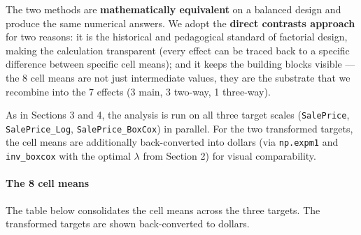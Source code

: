 The two methods are \textbf{mathematically equivalent} on a balanced
design and produce the same numerical answers. We adopt the
\textbf{direct contrasts approach} for two reasons: it is the historical
and pedagogical standard of factorial design, making the calculation
transparent (every effect can be traced back to a specific difference
between specific cell means); and it keeps the building blocks visible
--- the 8 cell means are not just intermediate values, they are the
substrate that we recombine into the 7 effects (3 main, 3 two-way, 1
three-way).

As in Sections 3 and 4, the analysis is run on all three target scales
(\texttt{SalePrice}, \texttt{SalePrice\_Log},
\texttt{SalePrice\_BoxCox}) in parallel. For the two transformed
targets, the cell means are additionally back-converted into dollars
(via \texttt{np.expm1} and \texttt{inv\_boxcox} with the optimal
\(\lambda\) from Section 2) for visual comparability.

\paragraph{The 8 cell means}\label{the-8-cell-means}

The table below consolidates the cell means across the three targets.
The transformed targets are shown back-converted to dollars.

